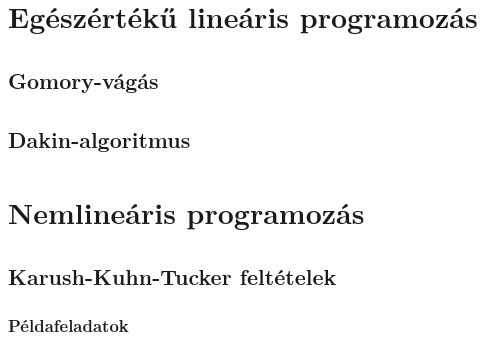 \documentclass[a4paper,12pt,svgnames]{report}
\begin{document}




\chapter{Egészértékű lineáris programozás}

\section{Gomory-vágás}

\section{Dakin-algoritmus}

\chapter{Nemlineáris programozás}

\section{Karush-Kuhn-Tucker feltételek}

\subsection{Példafeladatok}
\end{document}

